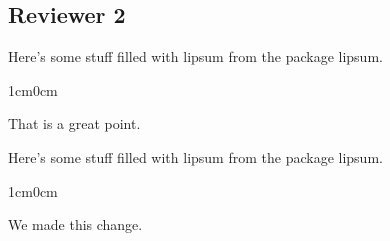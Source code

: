 \documentclass{article}
\newenvironment{response}
	{
	\begin{adjustwidth}{1cm}{0cm}
	\itshape %
	}
	{
	\end{adjustwidth}
	}
\begin{document}
\subsection*{Reviewer 2}
Here's some stuff filled with lipsum from the package lipsum. \lipsum[2]
\begin{response}
  That is a great point. \\
\end{response}


Here's some stuff filled with lipsum from the package lipsum. \lipsum[2]

\begin{response}
  We made this change. \\
\end{response}
\end{document}

